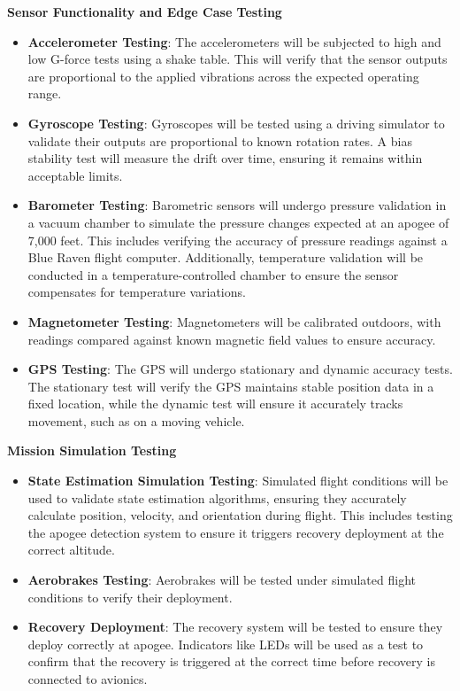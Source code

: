 \textbf{Sensor Functionality and Edge Case Testing}
\begin{itemize}
    \item \textbf{Accelerometer Testing}: The accelerometers will be subjected to high and low G-force tests using a shake table. This will verify that the sensor outputs are proportional to the applied vibrations across the expected operating range. 
    \item \textbf{Gyroscope Testing}: Gyroscopes will be tested using a driving simulator to validate their outputs are proportional to known rotation rates. A bias stability test will measure the drift over time, ensuring it remains within acceptable limits.
    \item \textbf{Barometer Testing}: Barometric sensors will undergo pressure validation in a vacuum chamber to simulate the pressure changes expected at an apogee of 7,000 feet. This includes verifying the accuracy of pressure readings against a Blue Raven flight computer. Additionally, temperature validation will be conducted in a temperature-controlled chamber to ensure the sensor compensates for temperature variations.
    \item \textbf{Magnetometer Testing}: Magnetometers will be calibrated outdoors, with readings compared against known magnetic field values to ensure accuracy.
    \item \textbf{GPS Testing}: The GPS will undergo stationary and dynamic accuracy tests. The stationary test will verify the GPS maintains stable position data in a fixed location, while the dynamic test will ensure it accurately tracks movement, such as on a moving vehicle.
\end{itemize}

\textbf{Mission Simulation Testing}
\begin{itemize}
    \item \textbf{State Estimation Simulation Testing}: Simulated flight conditions will be used to validate state estimation algorithms, ensuring they accurately calculate position, velocity, and orientation during flight. This includes testing the apogee detection system to ensure it triggers recovery deployment at the correct altitude.
    \item \textbf{Aerobrakes Testing}: Aerobrakes will be tested under simulated flight conditions to verify their deployment. 
    \item \textbf{Recovery Deployment}: The recovery system will be tested to ensure they deploy correctly at apogee. Indicators like LEDs will be used as a test to confirm that the recovery is triggered at the correct time before recovery is connected to avionics. 
\end{itemize}

